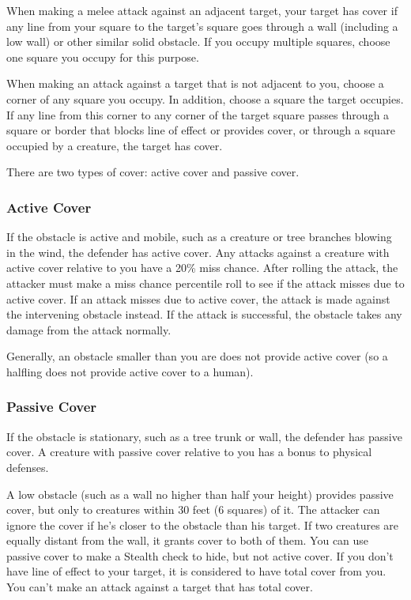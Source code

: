          When making a melee attack against an adjacent target, your target has cover if any line from your square to the target's square goes through a wall (including a low wall) or other similar solid obstacle. If you occupy multiple squares, choose one square you occupy for this purpose.

        When making an attack against a target that is not adjacent to you, choose a corner of any square you occupy. In addition, choose a square the target occupies. If any line from this corner to any corner of the target square passes through a square or border that blocks line of effect or provides cover, or through a square occupied by a creature, the target has cover.

        There are two types of cover: active cover and passive cover.

        \subsubsection{Active Cover}

            If the obstacle is active and mobile, such as a creature or tree branches blowing in the wind, the defender has active cover. Any attacks against a creature with active cover relative to you have a 20\% miss chance. After rolling the attack, the attacker must make a miss chance percentile roll to see if the attack misses due to active cover. If an attack misses due to active cover, the attack is made against the intervening obstacle instead. If the attack is successful, the obstacle takes any damage from the attack normally.

             Generally, an obstacle smaller than you are does not provide active cover (so a halfling does not provide active cover to a human).

        \subsubsection{Passive Cover}

            If the obstacle is stationary, such as a tree trunk or wall, the defender has passive cover. A creature with passive cover relative to you has a  bonus to physical defenses.

             A low obstacle (such as a wall no higher than half your height) provides passive cover, but only to creatures within 30 feet (6 squares) of it. The attacker can ignore the cover if he's closer to the obstacle than his target. If two creatures are equally distant from the wall, it grants cover to both of them.
             You can use passive cover to make a Stealth check to hide, but not active cover.
             If you don't have line of effect to your target, it is considered to have total cover from you. You can't make an attack against a target that has total cover.

